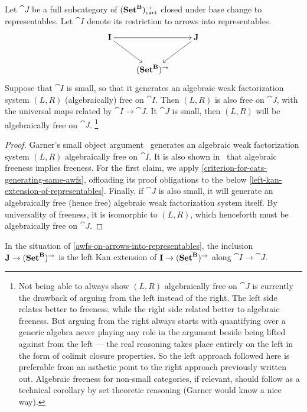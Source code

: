 \documentclass[reqno,10pt,a4paper,oneside]{amsart}
\begin{document}
\begin{proposition}
\label{awfs-on-arrows-into-representables}
Let $\cat{J}$ be a full subcategory of $(\mathbf{Set}^{\mathbf{B}})_{\text{\normalfont{cart}}}^{\to}$ closed under base change to representables.
Let $\cat{I}$ denote its restriction to arrows into representables.
\[
\xymatrix{
  \cat{I}
  \ar[rr]
  \ar[dr]
&&
  \cat{J}
  \ar[dl]
\\&
  (\Set^{\cat{B}})^{\to}
}
\]
Suppose that $\cat{I}$ is small, so that it generates an algebraic weak factorization system $(L, R)$ (algebraically) free on $\cat{I}$.
Then $(L, R)$ is also free on $\cat{J}$, with the universal maps related by $\cat{I} \to \cat{J}$.
It $\cat{J}$ is small, then $(L, R)$ will be algebraically free on $\cat{J}$.%
\footnote{
  Not being able to always show $(L, R)$ algebraically free on $\cat{J}$ is currently the drawback of arguing from the left instead of the right.
  The left side relates better to freeness, while the right side related better to algebraic freeness.
  But arguing from the right always starts with quantifying over a generic algebra never playing any role in the argument beside being lifted against from the left --- the real reasoning takes place entirely on the left in the form of colimit closure properties.
  So the left approach followed here is preferable from an asthetic point to the right approach previously written out.
  Algebraic freeness for non-small categories, if relevant, should follow as a technical corollary by set theoretic reasoning (Garner would know a nice way).
}
\end{proposition}

\begin{proof}
Garner's small object argument~\cite{garner:small-object-argument} generates an algebraic weak factorization system $(L, R)$ algebraically free on $\cat{I}$. 
It is also shown in~\cite{garner:small-object-argument} that algebraic freeness implies freeness.
For the first claim, we apply \cref{criterion-for-cats-generating-same-awfs}, offloading its proof obligations to the below \cref{left-kan-extension-of-representables}.
Finally, if $\cat{J}$ is also small, it will generate an algebraically free (hence free) algebraic weak factorization system itself.
By universality of freeness, it is isomorphic to $(L, R)$, which henceforth must be algebraically free on $\cat{J}$.
\end{proof}

\begin{lemma}
\label{left-kan-extension-of-representables}
In the situation of \cref{awfs-on-arrows-into-representables}, the inclusion $\mathbf{J} \to (\mathbf{Set}^{\mathbf{B}})^{\to}$ is the left Kan extension of $\mathbf{I} \to (\mathbf{Set}^{\mathbf{B}})^{\to}$ along $\cat{I} \to \cat{J}$.
\end{lemma}
\end{document}
